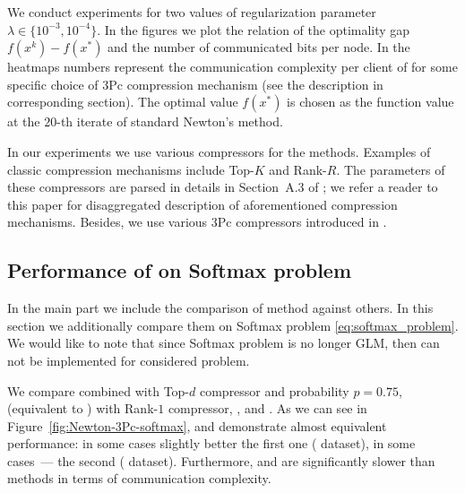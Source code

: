 \documentclass[11pt]{article}
\begin{document}
	We conduct experiments for two values of regularization parameter $\lambda\in \{10^{-3}, 10^{-4}\}$. In the figures we plot the relation of the optimality gap $f(x^k)-f(x^*)$ and the number of communicated bits per node. In the heatmaps numbers represent the communication complexity per client of  for some specific choice of 3Pc compression mechanism (see the description in corresponding section). The optimal value $f(x^*)$ is chosen as the function value at the $20$-th iterate of standard Newton's method.   
	
	
	In our experiments we use various compressors for the methods. Examples of classic compression mechanisms include Top-$K$ and Rank-$R$. The parameters of these compressors are parsed in details in Section~A.3 of \citep{FedNL2021}; we refer a reader to this paper for disaggregated description of aforementioned compression mechanisms. Besides, we use various 3Pc compressors introduced in \citep{richtarik3Pc}.
	
	\subsection{Performance of  on Softmax problem}
	
	In the main part we include the comparison of  method against others. In this section we additionally compare them on Softmax problem \eqref{eq:softmax_problem}. We would like to note that since Softmax problem is no longer GLM, then  \citep{Islamov2021NewtonLearn} can not be implemented for considered problem. 
	
	We compare  combined with Top-$d$ compressor and probability $p=0.75$,  (equivalent to  \citep{FedNL2021}) with Rank-$1$ compressor,  \citep{DINGO}, and  \citep{IOSFabbro2022}. As we can see in Figure~\ref{fig:Newton-3Pc-softmax},  and  demonstrate almost equivalent performance: in some cases slightly better the first one ( dataset), in some cases~--- the second ( dataset). Furthermore,  and  are significantly slower than  methods in terms of communication complexity.
	
\end{document}
